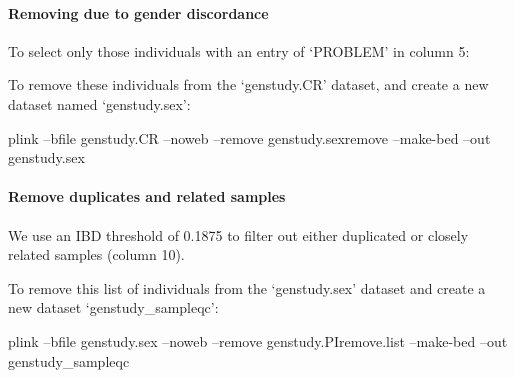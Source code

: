 \documentclass[]{book}
\newenvironment{Shaded}{\begin{snugshade}}{\end{snugshade}}
\newcommand{\StringTok}[1]{\textcolor[rgb]{0.31,0.60,0.02}{#1}}
\newcommand{\FunctionTok}[1]{\textcolor[rgb]{0.00,0.00,0.00}{#1}}
\newcommand{\OperatorTok}[1]{\textcolor[rgb]{0.81,0.36,0.00}{\textbf{#1}}}
\newcommand{\ExtensionTok}[1]{#1}
\newcommand{\NormalTok}[1]{#1}
\let\oldparagraph\paragraph
\renewcommand{\paragraph}[1]{\oldparagraph{#1}\mbox{}}
\begin{document}
\paragraph{Removing due to gender
discordance}\label{removing-due-to-gender-discordance}

To select only those individuals with an entry of `PROBLEM' in column 5:

\begin{Shaded}
\end{Shaded}

To remove these individuals from the `genstudy.CR' dataset, and create a
new dataset named `genstudy.sex':

\begin{Shaded}
\begin{Highlighting}[]
\ExtensionTok{plink}\NormalTok{ --bfile genstudy.CR --noweb --remove genstudy.sexremove --make-bed --out genstudy.sex}
\end{Highlighting}
\end{Shaded}

\paragraph{Remove duplicates and related
samples}\label{remove-duplicates-and-related-samples}

We use an IBD threshold of 0.1875 to filter out either duplicated or
closely related samples (column 10).

\begin{Shaded}
\end{Shaded}

To remove this list of individuals from the `genstudy.sex' dataset and
create a new dataset `genstudy\_sampleqc':

\begin{Shaded}
\begin{Highlighting}[]
\ExtensionTok{plink}\NormalTok{ --bfile genstudy.sex --noweb --remove genstudy.PIremove.list --make-bed --out genstudy_sampleqc}
\end{Highlighting}
\end{Shaded}
\end{document}
